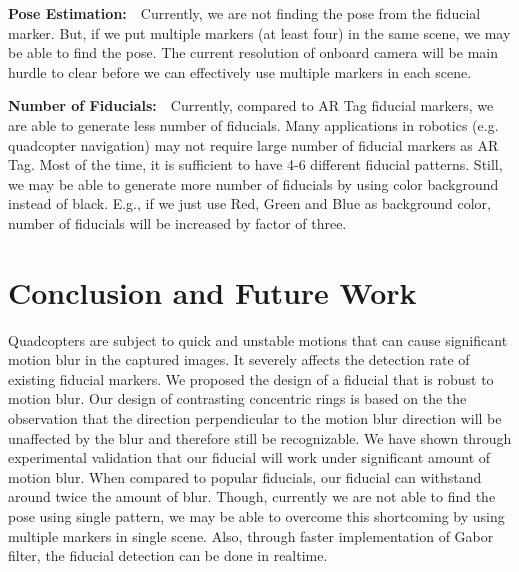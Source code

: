 \documentclass[runningheads]{llncs}
\begin{document}
\noindent\textbf{Pose Estimation:}~~Currently, we are not finding the pose from
the fiducial marker. But, if we put multiple markers (at least four) in the same
scene, we may be able to find the pose. The current resolution of onboard camera
will be main hurdle to clear before we can effectively use multiple markers in
each scene.

\noindent\textbf{Number of Fiducials:}~~Currently, compared to AR Tag fiducial
markers, we are able to generate less number of fiducials. Many applications in
robotics (e.g. quadcopter navigation) may not require large number of fiducial
markers as AR Tag. Most of the time, it is sufficient to have 4-6
different fiducial patterns. Still, we may be able to generate more number of
fiducials by using color background instead of black. E.g., if we just use Red,
Green and Blue as background color, number of fiducials will be increased by
factor of three.

\section{Conclusion and Future Work}
Quadcopters are subject to quick and unstable motions that can cause significant
motion blur in the captured images. It severely affects the detection rate of
existing fiducial markers. We proposed the design of a fiducial that is robust
to motion blur. Our design of contrasting concentric rings is based on the the
observation that the direction perpendicular to the motion blur direction will
be unaffected by the blur and therefore still be recognizable. We have shown
through experimental validation that our fiducial will work under significant
amount of motion blur. When compared to popular fiducials, our fiducial can
withstand around twice the amount of blur.  Though, currently we are not able to
find the pose using single pattern, we may be able to overcome this
shortcoming by using multiple markers in single scene. Also, through faster
implementation of Gabor filter, the fiducial detection can be done in realtime.



\end{document}
